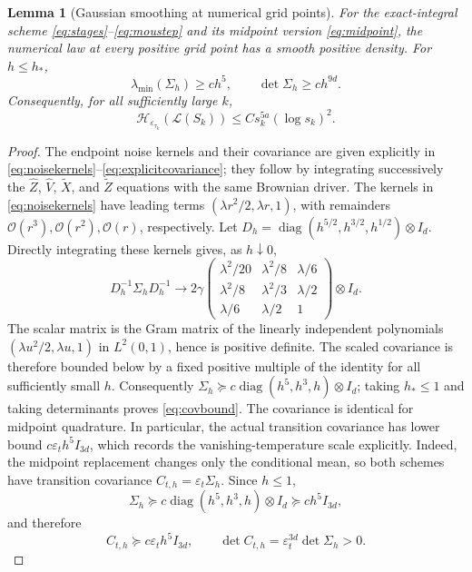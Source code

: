 \documentclass[11pt]{article}
\newtheorem{lemma}[theorem]{Lemma}
\theoremstyle{definition}
\newcommand{\Id}{I}
\newcommand{\cH}{\mathcal H}
\newcommand{\eps}{\varepsilon}
\begin{document}
\begin{lemma}[Gaussian smoothing at numerical grid points]\label{lem:gaussian}
For the exact-integral scheme \eqref{eq:stages}--\eqref{eq:moustep} and its
midpoint version \eqref{eq:midpoint}, the numerical law at every positive grid
point has a smooth
positive density. For $h\leq h_*$,
\begin{equation}\label{eq:covbound}
 \lambda_{\min}(\Sigma_h)\geq c h^5,\qquad
 \det\Sigma_h\geq c h^{9d}.
\end{equation}
Consequently, for all sufficiently large $k$,
\begin{equation}\label{eq:gridfisher}
 \cH_{\eps_{\tau_k}}(\mathcal L(S_k))
              \leq C s_k^{5a}(\log s_k)^2.
\end{equation}
\end{lemma}
\begin{proof}
The endpoint noise kernels and their covariance are given explicitly in
\eqref{eq:noisekernels}--\eqref{eq:explicitcovariance}; they follow by
integrating successively the $\widehat Z$, $\widehat V$, $\widetilde X$, and
$\widetilde Z$ equations with the same Brownian driver.
The kernels in \eqref{eq:noisekernels} have leading terms
$(\lambda r^2/2,\lambda r,1)$, with
remainders $\mathcal{O}(r^3),\mathcal{O}(r^2),\mathcal{O}(r)$, respectively.
Let $D_h=\operatorname{diag}\left(h^{5/2},h^{3/2},h^{1/2}\right)\otimes\Id_d$.
Directly integrating these kernels gives, as $h\downarrow0$,
\[
 D_h^{-1}\Sigma_hD_h^{-1}\longrightarrow
 2\gamma\begin{pmatrix}
 \lambda^2/20&\lambda^2/8&\lambda/6\\
 \lambda^2/8&\lambda^2/3&\lambda/2\\
 \lambda/6&\lambda/2&1
 \end{pmatrix}\otimes\Id_d.
\]
The scalar matrix is the Gram matrix of the linearly independent polynomials
$(\lambda u^2/2,\lambda u,1)$ in $L^2(0,1)$, hence is positive definite.
The scaled covariance is therefore bounded below by a fixed positive
multiple of the identity for all sufficiently small $h$. Consequently
$\Sigma_h\succeq c\operatorname{diag}(h^5,h^3,h)\otimes\Id_d$;
taking $h_*\leq1$ and taking determinants proves \eqref{eq:covbound}.
The covariance is identical for midpoint quadrature. In particular, the
actual transition covariance has lower bound $c\eps_t h^5\Id_{3d}$, which records
the vanishing-temperature scale explicitly.
Indeed, the midpoint replacement changes only the conditional mean, so both
schemes have transition covariance
$C_{t,h}=\eps_t\Sigma_h$.
Since $h\leq1$,
\[
 \Sigma_h\succeq c\operatorname{diag}\left(h^5,h^3,h\right)\otimes\Id_d
 \succeq ch^5\Id_{3d},
\]
and therefore
\[
 C_{t,h}\succeq c\eps_t h^5\Id_{3d},\qquad
 \det C_{t,h}=\eps_t^{3d}\det\Sigma_h>0.
\]


\end{proof}
\end{document}
